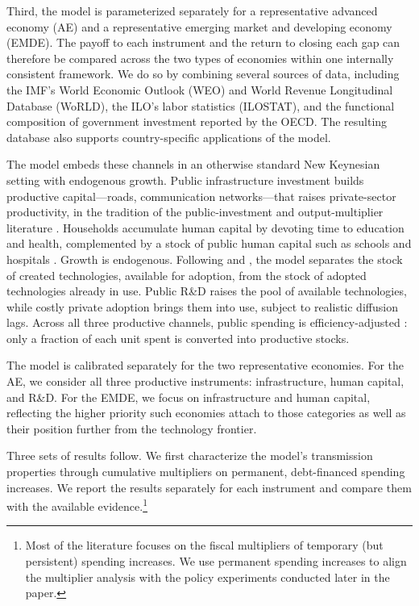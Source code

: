 \documentclass[a4paper,11pt]{article}
\begin{document}
Third, the model is parameterized separately for a representative advanced economy (AE) and a representative emerging market and developing economy (EMDE).
The payoff to each instrument and the return to closing each gap can therefore be compared across the two types of economies within one internally consistent framework.
We do so by combining several sources of data, including the IMF's World Economic Outlook (WEO) and World Revenue Longitudinal Database (WoRLD), the ILO's labor statistics (ILOSTAT), and the functional composition of government investment reported by the OECD.
The resulting database also supports country-specific applications of the model.


The model embeds these channels in an otherwise standard New Keynesian setting with endogenous growth.
Public infrastructure investment builds productive capital---roads, communication networks---that raises private-sector productivity, in the tradition of the public-investment and output-multiplier literature \citep{TraumYang2015, DrautzburgUhlig2015, IMF2020FM}.
Households accumulate human capital by devoting time to education and health, complemented by a stock of public human capital such as schools and hospitals \citep{BlankenauSimpson2004, Dissouetal2016, Atoliaetal2021}.
Growth is endogenous.
Following \citet{CominGertler2006} and \citet{Anzoateguietal2019}, the model separates the stock of created technologies, available for adoption, from the stock of adopted technologies already in use.
Public R\&D raises the pool of available technologies, while costly private adoption brings them into use, subject to realistic diffusion lags.
Across all three productive channels, public spending is efficiency-adjusted \citep{bergetal2012public}: only a fraction of each unit spent is converted into productive stocks.

The model is calibrated separately for the two representative economies.
For the AE, we consider all three productive instruments: infrastructure, human capital, and R\&D.
For the EMDE, we focus on infrastructure and human capital, reflecting the higher priority such economies attach to those categories as well as their position further from the technology frontier.



Three sets of results follow.
We first characterize the model's transmission properties through cumulative multipliers on permanent, debt-financed spending increases.
We report the results separately for each instrument and compare them with the available evidence.\footnote{Most of the literature focuses on the fiscal multipliers of temporary (but persistent) spending increases. We use permanent spending increases to align the multiplier analysis with the policy experiments conducted later in the paper.}
\end{document}
